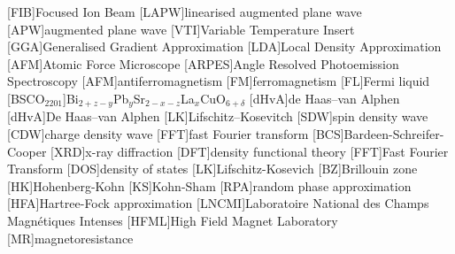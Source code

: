 
[FIB]{Focused Ion Beam}
[LAPW]{linearised augmented plane wave}
[APW]{augmented plane wave}
[VTI]{Variable Temperature Insert}
[GGA]{Generalised Gradient Approximation}
[LDA]{Local Density Approximation}
[AFM]{Atomic Force Microscope}
[ARPES]{Angle Resolved Photoemission Spectroscopy}
[AFM]{antiferromagnetism}
[FM]{ferromagnetism}
[FL]{Fermi liquid}
[BSCO$_{2201}$]{Bi$_{2+z-y}$Pb$_{y}$Sr$_{2-x-z}$La$_{x}$CuO$_{6+\delta}$}
[dHvA]{de Haas--van Alphen}
[dHvA]{De Haas--van Alphen}
[LK]{Lifschitz--Kosevitch}
[SDW]{spin density wave}
[CDW]{charge density wave}
[FFT]{fast Fourier transform}
[BCS]{Bardeen-Schreifer-Cooper}
[XRD]{x-ray diffraction}
[DFT]{density functional theory}
[FFT]{Fast Fourier Transform}
[DOS]{density of states}
[LK]{Lifschitz-Kosevich}
[BZ]{Brillouin zone}
[HK]{Hohenberg-Kohn}
[KS]{Kohn-Sham}
[RPA]{random phase approximation}
[HFA]{Hartree-Fock approximation}
[LNCMI]{Laboratoire National des Champs Magn\'{e}tiques Intenses} 
[HFML]{High Field Magnet Laboratory}
[MR]{magnetoresistance}


